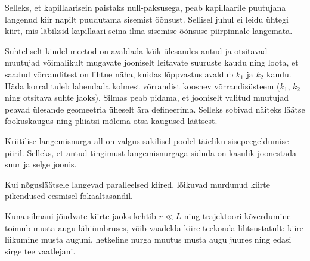 \documentclass[10pt, twoside]{article}
\begin{document}
{
\hint
Selleks, et kapillaarisein paistaks null-paksusega, peab kapillaarile puutujana langenud kiir napilt puudutama sisemist õõnsust. Sellisel juhul ei leidu ühtegi kiirt, mis läbiksid kapillaari seina ilma sisemise õõnsuse piirpinnale langemata.
\probend
\bigskip


\hint
Suhteliselt kindel meetod on avaldada kõik ülesandes antud ja otsitavad muutujad võimalikult mugavate jooniselt leitavate suuruste kaudu ning loota, et saadud võrranditest on lihtne näha, kuidas lõppvastus avaldub $k_1$ ja $k_2$ kaudu. Häda korral tuleb lahendada kolmest võrrandist koosnev võrrandisüsteem ($k_1$, $k_2$ ning otsitava suhte jaoks). Silmas peab pidama, et jooniselt valitud muutujad peavad ülesande geomeetria üheselt ära defineerima. Selleks sobivad näiteks läätse fookuskaugus ning pliiatsi mõlema otsa kaugused läätsest.
\probend
\bigskip


\hint
Kriitilise langemisnurga all on valgus sakilisel poolel täieliku sisepeegeldumise piiril. Selleks, et antud tingimust langemisnurgaga siduda on kasulik joonestada suur ja selge joonis.
\probend
\bigskip


\hint
Kui nõgusläätsele langevad paralleelsed kiired, lõikuvad
murdunud kiirte pikendused eesmisel fokaaltasandil.
\probend
\bigskip


\hint
Kuna silmani jõudvate kiirte jaoks kehtib $r \ll L$ ning trajektoori kõverdumine toimub musta augu lähiümbruses, võib vaadelda kiire teekonda lihtsustatult: kiire liikumine musta auguni, hetkeline nurga muutus musta augu juures ning edasi sirge tee vaatlejani.
\probend
\bigskip


}
\end{document}
